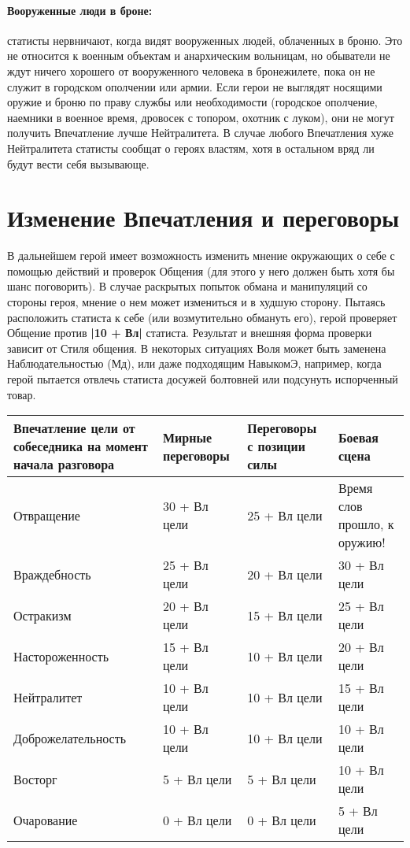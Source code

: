 \paragraph{Вооруженные люди в броне:} статисты нервничают, когда видят вооруженных людей, облаченных в броню. Это не относится к военным объектам и анархическим вольницам, но обыватели не ждут ничего хорошего от вооруженного человека в бронежилете, пока он не служит в городском ополчении или армии.
\newline Если герои не выглядят носящими оружие и броню по праву службы или необходимости (городское ополчение, наемники в военное время, дровосек с топором, охотник с луком), они не могут получить Впечатление лучше Нейтралитета. В случае любого Впечатления хуже Нейтралитета статисты сообщат о героях властям, хотя в остальном вряд ли будут вести себя вызывающе.

\section{Изменение Впечатления и переговоры}
В дальнейшем герой имеет возможность изменить мнение окружающих о себе с помощью действий и проверок Общения (для этого у него должен быть хотя бы шанс поговорить). В случае раскрытых попыток обмана и манипуляций со стороны героя, мнение о нем может измениться и в худшую сторону.
\newline Пытаясь расположить статиста к себе (или возмутительно обмануть его), герой проверяет Общение против \textbf{|10 + Вл|} статиста. Результат и внешняя форма проверки зависит от Стиля общения. В некоторых ситуациях Воля может быть заменена Наблюдательностью (Мд), или даже подходящим НавыкомЭ, например, когда герой пытается отвлечь статиста досужей болтовней или подсунуть испорченный товар. 

\begin{center} \begin{tabular}{|p{6cm}|p{3cm}|p{2.5cm}|p{2.5cm}|} \hline
Впечатление цели от собеседника на момент начала разговора & Мирные переговоры & Переговоры с позиции силы & Боевая сцена \\ \hline
Отвращение & 30 + Вл цели & 25 + Вл цели & Время слов прошло, к оружию! \\ \hline
Враждебность & 25 + Вл цели & 20 + Вл цели & 30 + Вл цели \\ \hline
Остракизм & 20 + Вл цели & 15 + Вл цели & 25 + Вл цели \\ \hline
Настороженность & 15 + Вл цели & 10 + Вл цели & 20 + Вл цели \\ \hline
Нейтралитет & 10 + Вл цели & 10 + Вл цели & 15 + Вл цели \\ \hline
Доброжелательность & 10 + Вл цели & 10 + Вл цели & 10 + Вл цели \\ \hline
Восторг & 5 + Вл цели & 5 + Вл цели & 10 + Вл цели \\ \hline
Очарование & 0 + Вл цели & 0 + Вл цели & 5 + Вл цели \\ \hline
\end{tabular} \end{center}

